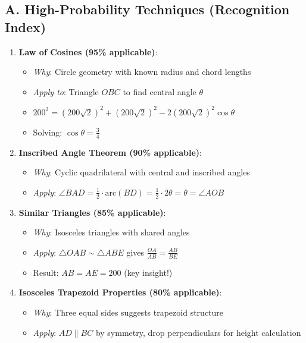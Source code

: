 \documentclass[12pt]{article}
\begin{document}
\begin{conversionbox}
\subsection*{A. High-Probability Techniques (Recognition Index)}
\begin{enumerate}[leftmargin=*]
    \item \textbf{Law of Cosines (95\% applicable)}: 
    \begin{itemize}
        \item \textit{Why}: Circle geometry with known radius and chord lengths
        \item \textit{Apply to}: Triangle $OBC$ to find central angle $\theta$
        \item $200^2 = (200\sqrt{2})^2 + (200\sqrt{2})^2 - 2(200\sqrt{2})^2\cos\theta$
        \item Solving: $\cos\theta = \frac{3}{4}$
    \end{itemize}
    
    \item \textbf{Inscribed Angle Theorem (90\% applicable)}:
    \begin{itemize}
        \item \textit{Why}: Cyclic quadrilateral with central and inscribed angles
        \item \textit{Apply}: $\angle BAD = \frac{1}{2} \cdot \text{arc}(BD) = \frac{1}{2} \cdot 2\theta = \theta = \angle AOB$
    \end{itemize}
    
    \item \textbf{Similar Triangles (85\% applicable)}:
    \begin{itemize}
        \item \textit{Why}: Isosceles triangles with shared angles
        \item \textit{Apply}: $\triangle OAB \sim \triangle ABE$ gives $\frac{OA}{AB} = \frac{AB}{BE}$
        \item Result: $AB = AE = 200$ (key insight!)
    \end{itemize}
    
    \item \textbf{Isosceles Trapezoid Properties (80\% applicable)}:
    \begin{itemize}
        \item \textit{Why}: Three equal sides suggests trapezoid structure
        \item \textit{Apply}: $AD \parallel BC$ by symmetry, drop perpendiculars for height calculation
    \end{itemize}
\end{enumerate}


\end{conversionbox}
\end{document}
